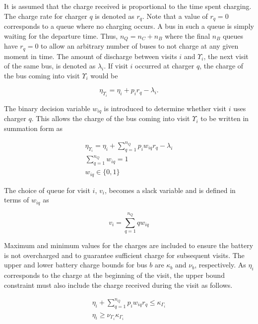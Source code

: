\documentclass[utf8]{FrontiersinHarvard}
\begin{document}
It is assumed that the charge received is proportional to the time spent charging. The charge rate for charger $q$ is
denoted as $r_q$. Note that a value of $r_q = 0$ corresponds to a queue where no charging occurs. A bus in such a queue
is simply waiting for the departure time. Thus, $n_Q = n_C + n_B$ where the final $n_B$ queues have $r_q = 0$ to allow
an arbitrary number of buses to not charge at any given moment in time. The amount of discharge between visits $i$ and
$\Upsilon_i$, the next visit of the same bus, is denoted as $\lambda_i$. If visit $i$ occurred at charger $q$, the charge of the bus
coming into visit $\Upsilon_i$ would be

\begin{equation}
	\eta_{\Upsilon_i} = \eta_i + p_i r_q - \lambda_i.
\end{equation}

The binary decision variable $w_{iq}$ is introduced to determine whether visit $i$ uses charger $q$. This allows the
charge of the bus coming into visit $\Upsilon_i$ to be written in summation form as

\begin{subequations}
    \label{subeq:pre_next_charge}
\begin{align}
    \eta_{\Upsilon_i} = \eta_i + \sum_{q=1}^{n_Q} p_i w_{iq} r_q - \lambda_i  \\
    \sum_{q=1}^{n_Q} w_{iq} = 1 \\
    w_{iq} \in \{0,1\}
\end{align}
\end{subequations}

The choice of queue for visit $i$, $v_i$, becomes a slack variable and is defined in terms of $w_{iq}$ as

\begin{equation}
    v_i = \sum_{q=1}^{n_Q} qw_{iq}
\end{equation}

Maximum and minimum values for the charges are included to ensure the battery is not overcharged and to guarantee
sufficient charge for subsequent visits. The upper and lower battery charge bounds for bus $b$ are $\kappa_b$ and $\nu_b$,
respectively. As $\eta_i$ corresponds to the charge at the beginning of the visit, the upper bound constraint must also
include the charge received during the visit as follows.

\begin{subequations}
    \label{subeq:pre_min_max}
\begin{align}
    \eta_i + \sum_{q=1}^{n_Q} p_i w_{iq} r_q \leq \kappa_{\Gamma_i}                 \\
    \eta_i \geq \nu_{\Gamma_i} \kappa_{\Gamma_i}
\end{align}
\end{subequations}
\end{document}
